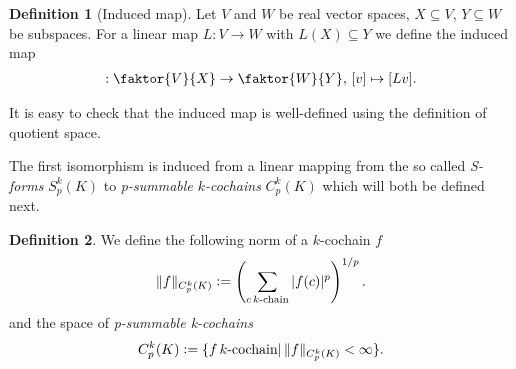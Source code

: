 \documentclass[12pt,a4paper]{article}
\theoremstyle{definition}
\newtheorem{definition}{Definition}
\newcommand{\norm}[1]{\lVert #1 \rVert}
\begin{document}
\begin{definition}[Induced map]
    Let $V$ and $W$ be real vector spaces, $X \subseteq V$, $Y \subseteq W$ be 
    subspaces. For a linear map $L: V \rightarrow W$ with $L(X) \subseteq Y$ 
    we define the induced map
    \begin{align*}
        [L]: \faktor{V}{X} \rightarrow \faktor{W}{Y},\,
        [v] \mapsto [Lv].
    \end{align*}     
\end{definition}
It is easy to check that the induced map is well-defined using the
definition of quotient space. %


The first isomorphism is induced from a linear mapping
from the so called \textit{S-forms} 
$S_p^k(K)$ to \textit{p-summable $k$-cochains} $C_p^k(K)$ which will both 
be defined next.

\begin{definition}
    We define the following norm of a $k$-cochain $f$
    \begin{align*}
    \norm{f}_{C_p^k(K)} \vcentcolon= 
    \left( \sum\limits_{c \, k\text{-chain}} |f(c)|^p \right)^{1/p}.
    \end{align*}
    and the space of \textit{p-summable k-cochains}
    \begin{align*}
    C_p^k(K) \vcentcolon= \{f \, k\text{-cochain} | \,  
    \norm{f}_{C_p^k(K)} < \infty \}.
    \end{align*}
\end{definition}
\end{document}
